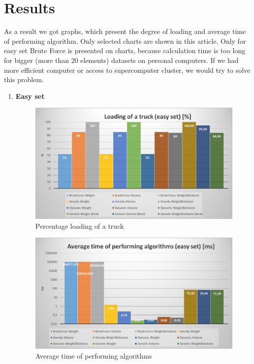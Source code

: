 \documentclass[conference,compsoc]{IEEEtran}
\begin{document}
\section{Results}
As a result we got graphs, which present the degree of loading and average time of performing algorithm. Only selected charts are shown in this article. Only for easy set Brute Force is presented on charts, because calculation time is too long for bigger (more than 20 elements) datasets on personal computers. If we had more 
efficient computer or access to supercomputer cluster, we would try to solve this problem.
\begin{enumerate}
\item \textbf{Easy set}
\begin{figure}[H]
  \centering
  \includegraphics[width=\columnwidth]{image003.png}
  \caption{Percentage loading of a truck }
\end{figure}

\begin{figure}[H]
  \centering
  \includegraphics[width=\columnwidth]{image006.png}
  \caption{Average time of performing algorithms}
\end{figure}



\end{enumerate}
\end{document}

